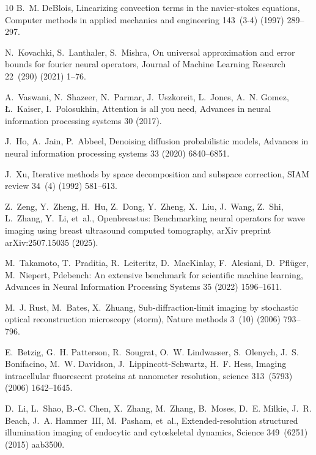\documentclass[preprint,numbers,sort&compress]{elsarticle}
\begin{document}
\begin{thebibliography}{10}
				B.~M. DeBlois, Linearizing convection terms in the navier-stokes equations,
				Computer methods in applied mechanics and engineering 143~(3-4) (1997)
				289--297.
				
				N.~Kovachki, S.~Lanthaler, S.~Mishra, On universal approximation and error
				bounds for fourier neural operators, Journal of Machine Learning Research
				22~(290) (2021) 1--76.
				
				A.~Vaswani, N.~Shazeer, N.~Parmar, J.~Uszkoreit, L.~Jones, A.~N. Gomez,
				{\L}.~Kaiser, I.~Polosukhin, Attention is all you need, Advances in neural
				information processing systems 30 (2017).
				
				J.~Ho, A.~Jain, P.~Abbeel, Denoising diffusion probabilistic models, Advances
				in neural information processing systems 33 (2020) 6840--6851.
				
				J.~Xu, Iterative methods by space decomposition and subspace correction, SIAM
				review 34~(4) (1992) 581--613.
				
				Z.~Zeng, Y.~Zheng, H.~Hu, Z.~Dong, Y.~Zheng, X.~Liu, J.~Wang, Z.~Shi, L.~Zhang,
				Y.~Li, et~al., Openbreastus: Benchmarking neural operators for wave imaging
				using breast ultrasound computed tomography, arXiv preprint arXiv:2507.15035
				(2025).
				
				M.~Takamoto, T.~Praditia, R.~Leiteritz, D.~MacKinlay, F.~Alesiani,
				D.~Pfl{\"u}ger, M.~Niepert, Pdebench: An extensive benchmark for scientific
				machine learning, Advances in Neural Information Processing Systems 35 (2022)
				1596--1611.
				
				M.~J. Rust, M.~Bates, X.~Zhuang, Sub-diffraction-limit imaging by stochastic
				optical reconstruction microscopy (storm), Nature methods 3~(10) (2006)
				793--796.
				
				E.~Betzig, G.~H. Patterson, R.~Sougrat, O.~W. Lindwasser, S.~Olenych, J.~S.
				Bonifacino, M.~W. Davidson, J.~Lippincott-Schwartz, H.~F. Hess, Imaging
				intracellular fluorescent proteins at nanometer resolution, science
				313~(5793) (2006) 1642--1645.
				
				D.~Li, L.~Shao, B.-C. Chen, X.~Zhang, M.~Zhang, B.~Moses, D.~E. Milkie, J.~R.
				Beach, J.~A. Hammer~III, M.~Pasham, et~al., Extended-resolution structured
				illumination imaging of endocytic and cytoskeletal dynamics, Science
				349~(6251) (2015) aab3500.
				

\end{thebibliography}
\end{document}
